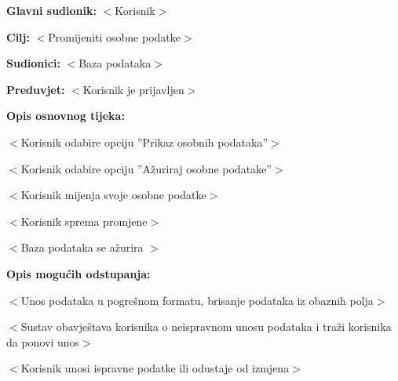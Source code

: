 					\noindent {}
					\begin{packed_item}
						
						\item \textbf{Glavni sudionik: }$<$Korisnik$>$
						\item  \textbf{Cilj:} $<$Promijeniti osobne podatke$>$
						\item  \textbf{Sudionici:} $<$Baza podataka$>$
						\item  \textbf{Preduvjet:} $<$Korisnik je prijavljen$>$
						\item  \textbf{Opis osnovnog tijeka:}
						
						\item[] \begin{packed_enum}
							
							\item $<$Korisnik odabire opciju ”Prikaz osobnih podataka”$>$
							\item $<$Korisnik odabire opciju ”Ažuriraj osobne podatake”$>$
							\item $<$Korisnik mijenja svoje osobne podatke$>$
							\item $<$Korisnik sprema promjene$>$
							\item $<$Baza podataka se ažurira $>$
						\end{packed_enum}
						
						\item  \textbf{Opis mogućih odstupanja:}
						
						\item[] \begin{packed_item}
							
							\item[3.a] $<$Unos podataka u pogrešnom formatu, brisanje podataka iz obaznih polja$>$
							\item[] \begin{packed_enum}
								
								\item $<$Sustav obavještava korisnika o neispravnom unosu podataka i traži korisnika da ponovi unos$>$
								\item $<$Korisnik unosi ispravne podatke ili odustaje od izmjena$>$
								
							\end{packed_enum}
							
						\end{packed_item}
					\end{packed_item}
					
